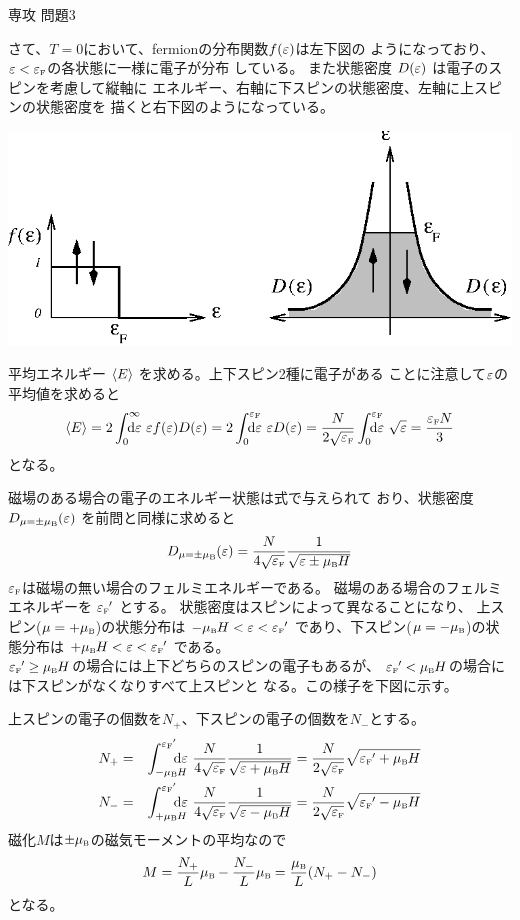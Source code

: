 \documentclass[fleqn]{jbook}
\begin{document}
\begin{answer}{専攻 問題3}{}
\begin{subanswers}
\begin{subsubanswers}
    さて、$T=0$において、fermionの分布関数$f(\varepsilon)$は左下図の
    ようになっており、$\eps<\fermiE$の各状態に一様に電子が分布
    している。
    また状態密度 $D(\varepsilon)$ は電子のスピンを考慮して縦軸に
    エネルギー、右軸に下スピンの状態密度、左軸に上スピンの状態密度を
    描くと右下図のようになっている。
%
    \begin{center}
      \mbox{\includegraphics[clip]{1995phy3-1.eps}}
    \end{center}
%
    平均エネルギー $\langle{E}\rangle$ を求める。上下スピン2種に電子がある
    ことに注意して$\varepsilon$の平均値を求めると
%
    \[ \Mean{E} = 2\Dint{0}{\infty}{\d{\eps}} \eps f(\eps) D(\eps)%
                = 2\Dint{0}{\fermiE}{\d{\eps}} \eps D(\eps)%
	        = \frac{N}{2\sqrt{\fermiE}}%
                    \Dint{0}{\fermiE}{\d{\eps}}\sqrt{\eps}%
                = \frac{\fermiE N}{3} \]
%
    となる。

  \SubSubAnswer
    磁場のある場合の電子のエネルギー状態は式で与えられて
    おり、状態密度 $D_{\mu=\pm\muB}(\eps)$ を前問と同様に求めると
%
    \[ D_{\mu=\pm\muB}(\eps)=\frac{N}{4\sqrt{\fermiE}}\frac{1}{\sqrt{\eps\pm\muB H}} \]
%
    $\fermiE$は磁場の無い場合のフェルミエネルギーである。
    磁場のある場合のフェルミエネルギーを $\fermiE'$ とする。
    状態密度はスピンによって異なることになり、
    上スピン($\mu=+\muB$)の状態分布は $-\muB H<\eps<\fermiE'$
    であり、下スピン($\mu=-\muB$)の状態分布は $+\muB H<\eps<\fermiE'$
    である。\\
%
    $\fermiE' \ge \muB H$の場合には上下どちらのスピンの電子もあるが、
    $\fermiE'<\muB H$の場合には下スピンがなくなりすべて上スピンと
    なる。この様子を下図に示す。\\
%
    \parbox[t]{100mm}{
    上スピンの電子の個数を$N_+$、下スピンの電子の個数を$N_-$とする。
%
    \begin{eqnarray*}
      N_+ &=& \Dint{-\muB H}{\fermiE'}{\quad\d{\eps}}%
              \frac{N}{4\sqrt{\fermiE}}\frac{1}{\sqrt{\eps+\muB H}}%
           = \frac{N}{2\sqrt{\fermiE}}\sqrt{\fermiE'+\muB H}\\
      N_- &=& \Dint{+\muB H}{\fermiE'}{\quad\d{\eps}}%
              \frac{N}{4\sqrt{\fermiE}}\frac{1}{\sqrt{\eps-\muB H}}%
           = \frac{N}{2\sqrt{\fermiE}}\sqrt{\fermiE'-\muB H}\\
    \end{eqnarray*}
%
    磁化$M$は$\pm\muB$の磁気モーメントの平均なので
%
    \[ M = \frac{N_+}{L}\muB - \frac{N_-}{L}\muB %
         = \frac{\muB}{L}(N_+ - N_-) \]
%
    となる。

}
\end{subsubanswers}
\end{subanswers}
\end{answer}
\end{document}
